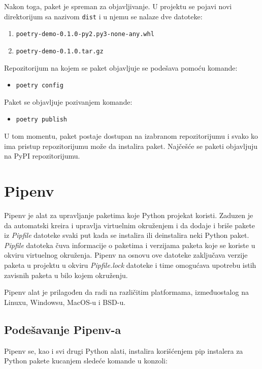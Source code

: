 \documentclass[12pt]{report}
\begin{document}
Nakon toga, paket je spreman za objavljivanje. U projektu se pojavi novi direktorijum sa nazivom \texttt{dist} i u njemu se nalaze dve datoteke:

\begin{enumerate}
    \item \texttt{poetry-demo-0.1.0-py2.py3-none-any.whl}
    \item \texttt{poetry-demo-0.1.0.tar.gz}
\end{enumerate}

Repozitorijum na kojem se paket objavljuje se podešava pomoću komande:

\begin{itemize}
    \item \texttt{poetry config}
\end{itemize}

Paket se objavljuje pozivanjem komande:

\begin{itemize}
    \item \texttt{poetry publish}
\end{itemize}

U tom momentu, paket postaje dostupan na izabranom repozitorijumu i svako ko ima pristup repozitorijumu može da instalira paket. Najčešće se paketi objavljuju na PyPI repozitorijumu.

\section{Pipenv}
Pipenv \cite{pipenv} je alat za upravljanje paketima koje Python projekat koristi. Zaduzen je da automatski kreira i upravlja virtuelnim okruženjem i da dodaje i briše pakete iz \textit{Pipfile} datoteke svaki put kada se instalira ili deinstalira neki Python paket. \textit{Pipfile} datoteka čuva informacije o paketima i verzijama paketa koje se koriste u okviru virtuelnog okruženja. Pipenv na osnovu ove datoteke zaključava verzije paketa u projektu u okviru \textit{Pipfile.lock} datoteke i time omogućava upotrebu istih zavisnih paketa u bilo kojem okruženju.

Pipenv alat je prilagođen da radi na različitim platformama, izmeđuostalog na Linux­u, Windows­u, MacOS-u i BSD-u.

\subsection{Podešavanje Pipenv-a}

Pipenv se, kao i svi drugi Python alati, instalira korišćenjem pip instalera za Python pakete kucanjem sledeće komande u konzoli:
\end{document}
